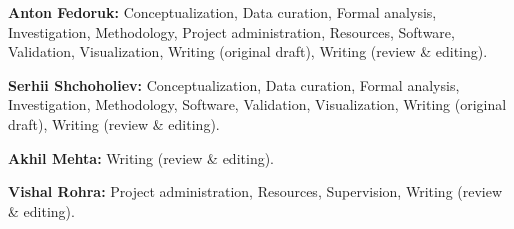 \noindent\textbf{Anton Fedoruk:}
Conceptualization, Data curation, Formal analysis,
Investigation, Methodology, Project administration, Resources, Software,
Validation, Visualization, Writing (original draft), Writing (review \& editing).\par

\noindent\textbf{Serhii Shchoholiev:}
Conceptualization, Data curation, Formal analysis,
Investigation, Methodology, Software, Validation, Visualization,
Writing (original draft), Writing (review \& editing).\par

\noindent\textbf{Akhil Mehta:}
Writing (review \& editing).\par

\noindent\textbf{Vishal Rohra:}
Project administration, Resources, Supervision,
Writing (review \& editing).\par
